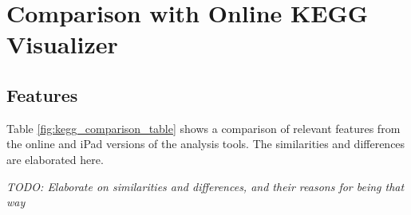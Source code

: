 \section{Comparison with Online KEGG Visualizer}
\label{sect:kegg_comparison}

\subsection{Features}
\label{sect:kegg_comparison_features}

Table \ref{fig:kegg_comparison_table} shows a comparison of relevant features
from the online and iPad versions of the \pathcasekegg analysis tools. The
similarities and differences are elaborated here.

\emph{TODO: Elaborate on similarities and differences, and their reasons for
being that way}

